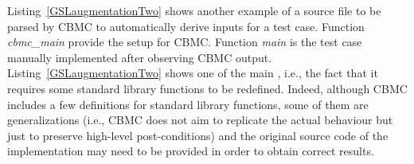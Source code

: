 Listing~\ref{GSLaugmentationTwo} shows another example of a source file to be parsed by CBMC to automatically derive inputs for a test case. Function \emph{cbmc\_main} provide the setup for CBMC. Function \emph{main} is the test case manually implemented after observing CBMC output. 
Listing~\ref{GSLaugmentationTwo} shows one of the main , i.e., the fact that it requires some standard library functions to be redefined. Indeed, although CBMC includes a few definitions for standard library functions, some of them are generalizations (i.e., CBMC does not aim to replicate the actual behaviour but just to preserve high-level post-conditions) and the original source code of the implementation may need to be provided in order to obtain correct results.





